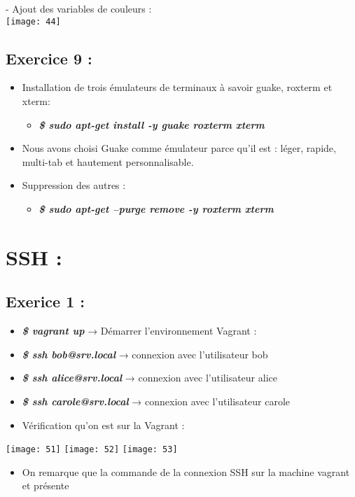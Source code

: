 \documentclass[a4paper]{article}
\begin{document}
	\hfill \break
	- Ajout des variables de couleurs : \\
	\texttt{[image: 44]}
	

\subsection*{Exercice 9 :}
	\begin{itemize}
		\item Installation de trois émulateurs de terminaux à savoir guake, roxterm et xterm: 
			\begin{itemize}
				\item \textit{\textbf{\$ sudo apt-get install -y guake roxterm xterm}}
			\end{itemize}
		\item Nous avons choisi Guake comme émulateur parce qu'il est : léger, rapide, multi-tab et hautement personnalisable.
		\item Suppression des autres : 
		\begin{itemize}
				\item \textit{\textbf{\$ sudo apt-get --purge remove -y roxterm xterm}}
			\end{itemize}
	\end{itemize}
	
\newpage
	\section{SSH :}
	\subsection{Exerice 1 :}
	\begin{itemize}
		\item \textbf{\textit{\$ vagrant up }} →  Démarrer l'environnement Vagrant : 
		\item \textbf{\textit{\$ ssh bob@srv.local }} → connexion avec l'utilisateur bob
		\item \textbf{\textit{\$ ssh alice@srv.local }} → connexion avec l'utilisateur alice
		\item \textbf{\textit{\$ ssh carole@srv.local }} → connexion avec l'utilisateur carole 
		\item Vérification qu'on est sur la Vagrant :
	\end{itemize}
	
	\texttt{[image: 51]}
	\texttt{[image: 52]}
	\texttt{[image: 53]}
	\begin{itemize}
		\item On remarque que la commande de la connexion SSH sur la machine vagrant et présente
	\end{itemize}
	
\end{document}
